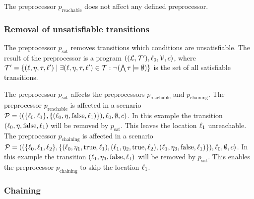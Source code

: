 The preprocessor $p_{\text{reachable}}$ does not affect any defined preprocessor.

\subsubsection{Removal of unsatisfiable transitions}

The preprocessor $p_{\text{sat}}$ removes transitions which conditions are unsatisfiable.
The result of the preprocessor is a program $((\mathcal{L}, \mathcal{T}'), \ell_0, \mathcal{V}, c)$, where $\mathcal{T}' = \lbrace (\ell,\eta,\tau,\ell') \mid \exists (\ell,\eta,\tau,\ell') \in \mathcal{T}: \neg (\bigwedge \tau \models \emptyset) \rbrace$ is the set of all satisfiable transitions.

The preprocessor $p_{\text{sat}}$ affects the preprocessors $p_{\text{reachable}}$ and $p_{\text{chaining}}$.
The preprocessor $p_{\text{reachable}}$ is affected in a scenario $\mathcal{P} = ((\lbrace \ell_0, \ell_1 \rbrace, \lbrace (\ell_0,\eta,\text{false},\ell_1) \rbrace), \ell_0, \emptyset, c)$.
In this example the transition $(\ell_0,\eta,\text{false},\ell_1)$ will be removed by $p_{\text{sat}}$.
This leaves the location $\ell_1$ unreachable.
The preprocessor $p_{\text{chaining}}$ is affected in a scenario $\mathcal{P} = ((\lbrace \ell_0, \ell_1, \ell_2 \rbrace, \lbrace (\ell_0,\eta_1,\text{true},\ell_1), (\ell_1,\eta_2,\text{true},\ell_2), (\ell_1,\eta_3,\text{false},\ell_1) \rbrace), \ell_0, \emptyset, c)$.
In this example the transition $(\ell_1,\eta_3,\text{false},\ell_1)$ will be removed by $p_{\text{sat}}$.
This enables the preprocessor $p_{\text{chaining}}$ to skip the location $\ell_1$.

\subsubsection{Chaining}

